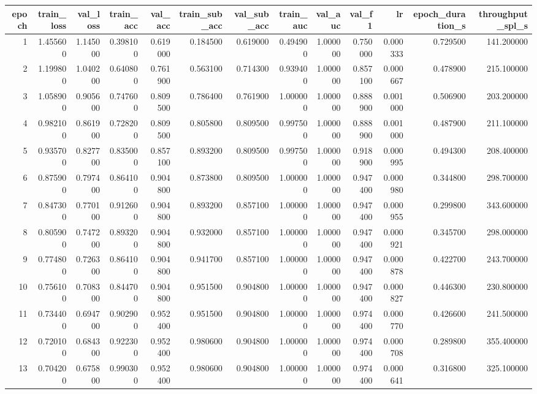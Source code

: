 \begin{tabular}{rrrrrrrrrrrrr}
\toprule
epoch & train_loss & val_loss & train_acc & val_acc & train_sub_acc & val_sub_acc & train_auc & val_auc & val_f1 & lr & epoch_duration_s & throughput_spl_s \\
\midrule
1 & 1.455600 & 1.145000 & 0.398100 & 0.619000 & 0.184500 & 0.619000 & 0.494900 & 1.000000 & 0.750000 & 0.000333 & 0.729500 & 141.200000 \\
2 & 1.199800 & 1.040200 & 0.640800 & 0.761900 & 0.563100 & 0.714300 & 0.939400 & 1.000000 & 0.857100 & 0.000667 & 0.478900 & 215.100000 \\
3 & 1.058900 & 0.905600 & 0.747600 & 0.809500 & 0.786400 & 0.761900 & 1.000000 & 1.000000 & 0.888900 & 0.001000 & 0.506900 & 203.200000 \\
4 & 0.982100 & 0.861900 & 0.728200 & 0.809500 & 0.805800 & 0.809500 & 0.997500 & 1.000000 & 0.888900 & 0.001000 & 0.487900 & 211.100000 \\
5 & 0.935700 & 0.827700 & 0.835000 & 0.857100 & 0.893200 & 0.809500 & 0.997500 & 1.000000 & 0.918900 & 0.000995 & 0.494300 & 208.400000 \\
6 & 0.875900 & 0.797400 & 0.864100 & 0.904800 & 0.873800 & 0.809500 & 1.000000 & 1.000000 & 0.947400 & 0.000980 & 0.344800 & 298.700000 \\
7 & 0.847300 & 0.770100 & 0.912600 & 0.904800 & 0.893200 & 0.857100 & 1.000000 & 1.000000 & 0.947400 & 0.000955 & 0.299800 & 343.600000 \\
8 & 0.805900 & 0.747200 & 0.893200 & 0.904800 & 0.932000 & 0.857100 & 1.000000 & 1.000000 & 0.947400 & 0.000921 & 0.345700 & 298.000000 \\
9 & 0.774800 & 0.726300 & 0.864100 & 0.904800 & 0.941700 & 0.857100 & 1.000000 & 1.000000 & 0.947400 & 0.000878 & 0.422700 & 243.700000 \\
10 & 0.756100 & 0.708300 & 0.844700 & 0.904800 & 0.951500 & 0.904800 & 1.000000 & 1.000000 & 0.947400 & 0.000827 & 0.446300 & 230.800000 \\
11 & 0.734400 & 0.694700 & 0.902900 & 0.952400 & 0.951500 & 0.904800 & 1.000000 & 1.000000 & 0.974400 & 0.000770 & 0.426600 & 241.500000 \\
12 & 0.720100 & 0.684300 & 0.922300 & 0.952400 & 0.980600 & 0.904800 & 1.000000 & 1.000000 & 0.974400 & 0.000708 & 0.289800 & 355.400000 \\
13 & 0.704200 & 0.675800 & 0.990300 & 0.952400 & 0.980600 & 0.904800 & 1.000000 & 1.000000 & 0.974400 & 0.000641 & 0.316800 & 325.100000 \\

\end{tabular}
